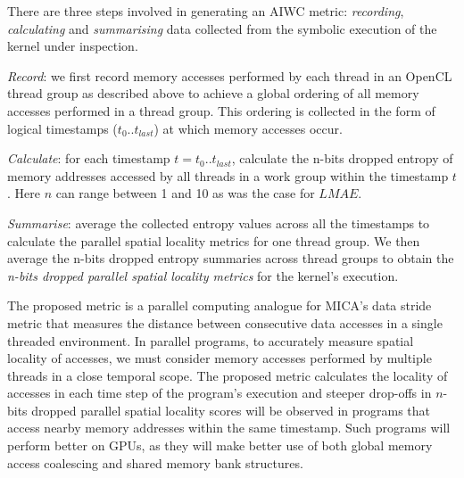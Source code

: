 \documentclass[review=false, sigchi]{acmart}
\begin{document}
	There are three steps involved in generating an AIWC metric: \textit{recording}, \textit{calculating} and \textit{summarising} data collected from the symbolic execution of the kernel under inspection.
	
	\textit{Record}: we first record memory accesses performed by each thread in an OpenCL thread group as described above to achieve a global ordering of all memory accesses performed in a thread group. This ordering is collected in the form of logical timestamps ($t_0 .. t_{last}$) at which memory accesses occur.
	
	\textit{Calculate}: for each timestamp $t = t_0 .. t_{last}$, calculate the n-bits dropped entropy of memory addresses accessed by all threads in a work group within the timestamp $t$. Here $n$ can range between 1 and 10 as was the case for $LMAE$.
	
	\textit{Summarise}: average the collected entropy values across all the timestamps to calculate the parallel spatial locality metrics for one thread group. We then average the n-bits dropped entropy summaries across thread groups to obtain the \textit{n-bits dropped parallel spatial locality metrics} for the kernel's execution.
	
	

	The proposed metric is a parallel computing analogue for MICA's data stride metric that measures the distance between consecutive data accesses in a single threaded environment. In parallel programs, to accurately measure spatial locality of accesses, we must consider memory accesses performed by multiple threads in a close temporal scope. The proposed metric calculates the locality of accesses in each time step of the program's execution and steeper drop-offs in $n$-bits dropped parallel spatial locality scores will be observed in programs that access nearby memory addresses within the same timestamp. Such programs will perform better on GPUs, as they will make better use of both global memory access coalescing and shared memory bank structures.
	
\end{document}
